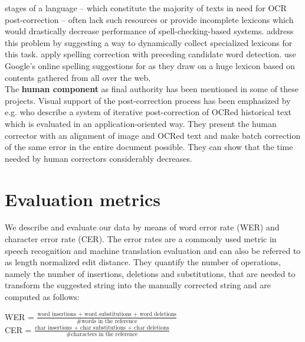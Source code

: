 \documentclass[11pt,letterpaper]{article}
\begin{document}
stages of a language -- which constitute the majority of texts in need for OCR post-correction -- often lack such resources or provide incomplete lexicons which 
would drastically decrease performance of spell-checking-based systems.  address this problem by suggesting a way to dynamically collect specialized lexicons for this task.
 apply spelling correction with preceding candidate word detection.
 use Google's online spelling suggestions for as they draw on a huge lexicon based on contents gathered from all over the web.\\
The \textbf{human component} as final authority has been mentioned in some of these projects. Visual support of the post-correction process has been emphasized by e.g.  who describe a system of iterative post-correction of OCRed historical text which is evaluated in an application-oriented way. They present the human corrector with an alignment of image and OCRed text and make batch correction of the same error in the entire document possible. They can show that the time needed by human correctors considerably decreases.\\



\section{Evaluation metrics}\label{metrics}

We describe and evaluate our data by means of word error rate (WER) and character error rate (CER).
The error rates are a commonly used metric in speech recognition and machine translation evaluation and can also be referred to as length normalized edit distance. They quantify the number of operations, namely the number of insertions, deletions and substitutions, that are needed to transform the suggested string into the manually corrected string and are computed as follows:

\begin{small}
WER = $\displaystyle\frac{\mbox{word insertions + word substitutions + word deletions}}{\mbox{\# words in the reference}}$ \\

CER = $\displaystyle\frac{\mbox{char insertions + char substitutions + char deletions}}{\mbox{\# characters in the reference}}$ \\
\end{small}
\end{document}
